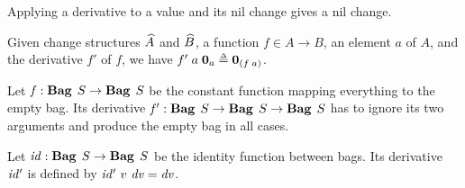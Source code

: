 Applying a derivative to a value and its nil change gives a nil
change.
%
\begin{lemma}
  \label{thm:deriv-nil}
  Given change structures $\widehat{A}$ and
  $\widehat{B}$, a function $f \in A \to B$, an element $a$
  of $A$, and the derivative $f'$ of $f$, we have
  $\App{\App{f'}{a}}{\NilC{a}} \Doe \NilC{\App* f a}$.
\end{lemma}

\begin{examples}
Let $\Term{f}:\Fun{\Bag S}{\Bag S}$ be the constant function mapping
everything to the empty bag. Its derivative
$\Term{f'}:\Fun{\Bag S}{\Fun{\Bag S}{\Bag S}}$ has to ignore its two
arguments and produce the empty bag in all cases.

Let $\Term{id}:\Fun{\Bag S}{\Bag S}$ be the identity function between
bags. Its derivative $\mathit{id'}$ is defined by
$\mathit{id'}~v~\mathit{dv} = \mathit{dv}$.
\end{examples}


